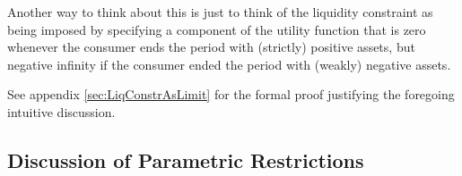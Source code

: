 \documentclass[BufferStockTheory]{subfiles}
\begin{document}
Another way to think about this is just to think of the liquidity
constraint as being imposed by specifying a component of the utility
function that is zero whenever the consumer ends the period with
(strictly) positive assets, but negative infinity if the consumer
ended the period with (weakly) negative assets.

See appendix \ref{sec:LiqConstrAsLimit} for the formal proof justifying the
foregoing intuitive discussion.

\hypertarget{Discussion-of-Parametric-Restrictions}{}
\subsection{Discussion of Parametric Restrictions}\label{sec:discussConvergence}

\begin{comment}
  \subsubsection{Perfect Foresight Case}

  The unconstrained perfect foresight model is the natural starting
  point for developing the intuition behind our parametric restrictions.
  As noted above, the Return Impatience Condition (\RIC) is necessary in
  this context to guarantee that the PDV of the stream of future
  consumption is finite; value is then given by
  \begin{align*}
    \vLevBF_{t}  & = \uFunc(\cLevBF_{t})+\DiscFac \uFunc(\overbrace{(\Rfree \DiscFac)^{1/\CRRA}\cLevBF_{t}}^{=\cLevBF_{t+1}})+\DiscFac^{2} \uFunc(((\Rfree \DiscFac)^{1/\CRRA})^{2}\cLevBF_{t})+...
    \\  & = \uFunc(\cLevBF_{t})\left(1+\DiscFac ((\Rfree \DiscFac)^{1/\CRRA})^{1-\CRRA}+(\DiscFac ((\Rfree \DiscFac)^{1/\CRRA})^{1-\CRRA})^{2}+...\right)
  \end{align*}
  which has a finite limit so long as $\DiscFac ((\Rfree \DiscFac)^{1/\CRRA})^{1-\CRRA} < 1$.  But
  \begin{align*}
    \DiscFac ({\Pat})^{1-\CRRA}   & = \DiscFac (\DiscFac \Rfree)^{1/\CRRA - 1}
    \\  & = {\Pat}/\Rfree = \PatR
  \end{align*}
  so the \RIC~guarantees the finiteness of value in addition to the PDV
  of consumption (given a finite starting point).

  The starting point for consumption is guaranteed to be finite by
  imposition of the finite human wealth (\FHWC) requirement.  (If human
  wealth were unbounded, our unconstrained consumer could freely borrow
  in order to spend an infinite amount in every period.)


\end{comment}
\end{document}
